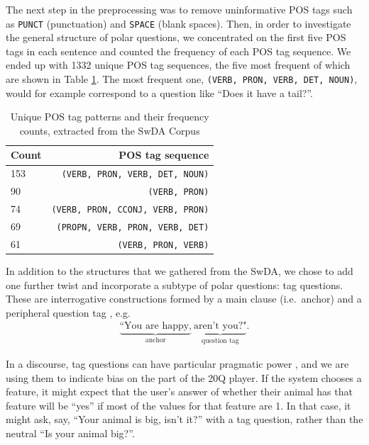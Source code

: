 \documentclass[11pt,a4paper]{article}
\begin{document}
The next step in the preprocessing was to remove uninformative POS tags such as \texttt{PUNCT} (punctuation) and \texttt{SPACE} (blank spaces).
Then, in order to investigate the general structure of polar questions, we concentrated on the first five POS tags in each sentence and counted the frequency of each POS tag sequence.
We ended up with 1332 unique POS tag sequences, the five most frequent of which are shown in Table \ref{tab:pos_patterns}.
The most frequent one, \texttt{(VERB, PRON, VERB, DET, NOUN)}, would for example correspond to a question like ``Does it have a tail?''.

\begin{table}
\centering
{\small
\begin{tabular}{lr}
	\toprule
	Count & POS tag sequence \\ \midrule
    153 & \texttt{(VERB, PRON, VERB, DET, NOUN)}\\
	90 & \texttt{(VERB, PRON)}\\
	74 & \texttt{(VERB, PRON, CCONJ, VERB, PRON)}\\
	69 & \texttt{(PROPN, VERB, PRON, VERB, DET)}\\
	61 & \texttt{(VERB, PRON, VERB)}\\
	\bottomrule
\end{tabular}
}
\caption{Unique POS tag patterns and their frequency counts, extracted from the SwDA Corpus}
\label{tab:pos_patterns}
\end{table}

In addition to the structures that we gathered from the SwDA, we chose to add one further twist and incorporate a subtype of polar questions: tag questions.
These are interrogative constructions formed by a main clause (i.e.\ anchor) and a peripheral question tag \citep{Bawden2017, Bonsignori2007, TottieEa2006}, e.g. 
\begin{gather*}
    \underbrace{\text{``You are happy,}}_{\text{anchor}}\ \underbrace{\text{aren't you?"}}_{\text{question tag}}. 
\end{gather*}

In a discourse, tag questions can have particular pragmatic power \citep{TottieEa2006}, and we are using them to indicate bias on the part of the 20Q player.
If the system chooses a feature, it might expect that the user's answer of whether their animal has that feature will be ``yes'' if most of the values for that feature are 1.
In that case, it might ask, say, ``Your animal is big, isn't it?'' with a tag question, rather than the neutral ``Is your animal big?''.
\end{document}
